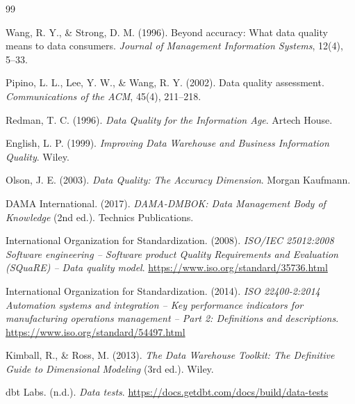 \documentclass[UTF8,fontset=fandol,openany,zihao=-4]{ctexbook}
\begin{document}
\begin{thebibliography}{99}
\raggedright
{}
Wang, R. Y., \& Strong, D. M. (1996).
Beyond accuracy: What data quality means to data consumers.
\emph{Journal of Management Information Systems}, 12(4), 5--33.

Pipino, L. L., Lee, Y. W., \& Wang, R. Y. (2002).
Data quality assessment.
\emph{Communications of the ACM}, 45(4), 211--218.

Redman, T. C. (1996).
\emph{Data Quality for the Information Age}.
Artech House.

English, L. P. (1999).
\emph{Improving Data Warehouse and Business Information Quality}.
Wiley.

Olson, J. E. (2003).
\emph{Data Quality: The Accuracy Dimension}.
Morgan Kaufmann.

DAMA International. (2017).
\emph{DAMA-DMBOK: Data Management Body of Knowledge} (2nd ed.).
Technics Publications.

International Organization for Standardization. (2008).
\emph{ISO/IEC 25012:2008 Software engineering -- Software product Quality Requirements and Evaluation (SQuaRE) -- Data quality model}.
\url{https://www.iso.org/standard/35736.html}

International Organization for Standardization. (2014).
\emph{ISO 22400-2:2014 Automation systems and integration -- Key performance indicators for manufacturing operations management -- Part 2: Definitions and descriptions}.
\url{https://www.iso.org/standard/54497.html}

Kimball, R., \& Ross, M. (2013).
\emph{The Data Warehouse Toolkit: The Definitive Guide to Dimensional Modeling} (3rd ed.).
Wiley.

dbt Labs. (n.d.).
\emph{Data tests}.
\url{https://docs.getdbt.com/docs/build/data-tests}
\end{thebibliography}
\end{document}
